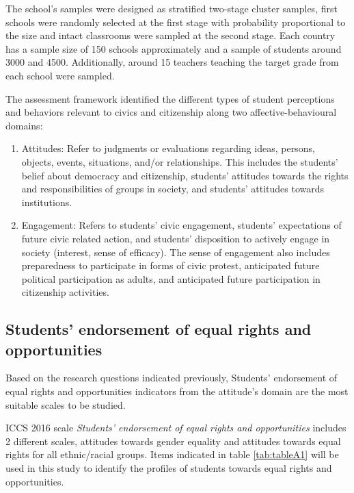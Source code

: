 \documentclass[12pt,a4paper,oneside]{reedthesis}
\providecommand{\tightlist}{%
  \setlength{\itemsep}{0pt}\setlength{\parskip}{0pt}}
\begin{document}
The school's samples were designed as stratified two-stage cluster samples, first schools were randomly selected at the first stage with probability proportional to the size and intact classrooms were sampled at the second stage. Each country has a sample size of 150 schools approximately and a sample of students around 3000 and 4500. Additionally, around 15 teachers teaching the target grade from each school were sampled.

The assessment framework identified the different types of student perceptions and behaviors relevant to civics and citizenship along two affective-behavioural domains:
\begin{enumerate}
\def\labelenumi{\roman{enumi}.}
\tightlist
\item
  Attitudes: Refer to judgments or evaluations regarding ideas, persons, objects, events, situations, and/or relationships. This includes the students' belief about democracy and citizenship, students' attitudes towards the rights and responsibilities of groups in society, and students' attitudes towards institutions.\\
\item
  Engagement: Refers to students' civic engagement, students' expectations of future civic related action, and students' disposition to actively engage in society (interest, sense of efficacy). The sense of engagement also includes preparedness to participate in forms of civic protest, anticipated future political participation as adults, and anticipated future participation in citizenship activities.
\end{enumerate}
\hypertarget{students-endorsement-of-equal-rights-and-opportunities}{%
\subsection{Students' endorsement of equal rights and opportunities}\label{students-endorsement-of-equal-rights-and-opportunities}}

Based on the research questions indicated previously, Students' endorsement of equal rights and opportunities indicators from the attitude's domain are the most suitable scales to be studied.

ICCS 2016 scale \emph{Students' endorsement of equal rights and opportunities} includes 2 different scales, attitudes towards gender equality and attitudes towards equal rights for all ethnic/racial groups. Items indicated in table \ref{tab:tableA1} will be used in this study to identify the profiles of students towards equal rights and opportunities.
\end{document}
